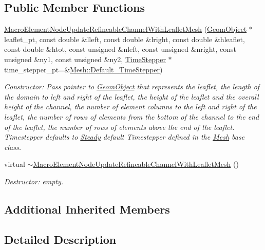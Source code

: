 \subsection*{Public Member Functions}
\begin{DoxyCompactItemize}
\item 
\hyperlink{classoomph_1_1MacroElementNodeUpdateRefineableChannelWithLeafletMesh_aa15c165d7e755e4e885d895e16bb76b8}{Macro\+Element\+Node\+Update\+Refineable\+Channel\+With\+Leaflet\+Mesh} (\hyperlink{classoomph_1_1GeomObject}{Geom\+Object} $\ast$leaflet\+\_\+pt, const double \&lleft, const double \&lright, const double \&hleaflet, const double \&htot, const unsigned \&nleft, const unsigned \&nright, const unsigned \&ny1, const unsigned \&ny2, \hyperlink{classoomph_1_1TimeStepper}{Time\+Stepper} $\ast$time\+\_\+stepper\+\_\+pt=\&\hyperlink{classoomph_1_1Mesh_a12243d0fee2b1fcee729ee5a4777ea10}{Mesh\+::\+Default\+\_\+\+Time\+Stepper})
\begin{DoxyCompactList}\small\item\em Constructor\+: Pass pointer to \hyperlink{classoomph_1_1GeomObject}{Geom\+Object} that represents the leaflet, the length of the domain to left and right of the leaflet, the height of the leaflet and the overall height of the channel, the number of element columns to the left and right of the leaflet, the number of rows of elements from the bottom of the channel to the end of the leaflet, the number of rows of elements above the end of the leaflet. Timestepper defaults to \hyperlink{classoomph_1_1Steady}{Steady} default Timestepper defined in the \hyperlink{classoomph_1_1Mesh}{Mesh} base class. \end{DoxyCompactList}\item 
virtual \hyperlink{classoomph_1_1MacroElementNodeUpdateRefineableChannelWithLeafletMesh_af22b4288c7db553beb8658c29eb2cdaf}{$\sim$\+Macro\+Element\+Node\+Update\+Refineable\+Channel\+With\+Leaflet\+Mesh} ()
\begin{DoxyCompactList}\small\item\em Destructor\+: empty. \end{DoxyCompactList}\end{DoxyCompactItemize}
\subsection*{Additional Inherited Members}


\subsection{Detailed Description}
